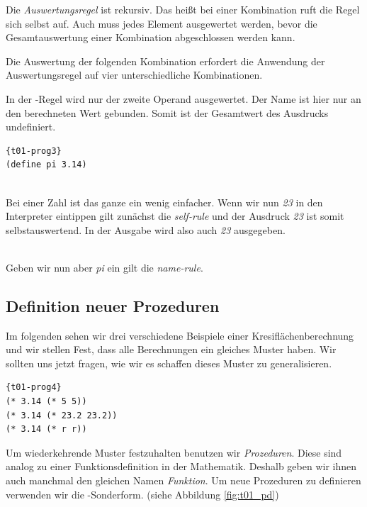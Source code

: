 Die \textit{Auswertungsregel} ist rekursiv. Das heißt bei einer Kombination ruft die Regel sich selbst auf. Auch muss jedes Element ausgewertet werden, bevor die Gesamtauswertung einer Kombination abgeschlossen werden kann.

Die Auswertung der folgenden Kombination erfordert die Anwendung der Auswertungsregel auf vier unterschiedliche Kombinationen.


In der -Regel wird nur der zweite Operand ausgewertet. Der Name ist hier nur an den berechneten Wert gebunden. Somit ist der Gesamtwert des Ausdrucks undefiniert.
\begin{lstlisting}{t01-prog3}
(define pi 3.14)
\end{lstlisting}
 \\

Bei einer Zahl ist das ganze ein wenig einfacher. Wenn wir nun \textit{23} in den Interpreter eintippen gilt zunächst die \textit{self-rule} und der Ausdruck \textit{23} ist somit selbstauswertend. In der Ausgabe wird also auch \textit{23} ausgegeben.

\\

Geben wir nun aber \textit{pi} ein gilt die \textit{name-rule}.


\subsection{Definition neuer Prozeduren}
Im folgenden sehen wir drei verschiedene Beispiele einer Kresiflächenberechnung und wir stellen Fest, dass alle Berechnungen ein gleiches Muster haben. Wir sollten uns jetzt fragen, wie wir es schaffen dieses Muster zu generalisieren.
\begin{lstlisting}{t01-prog4}
(* 3.14 (* 5 5))
(* 3.14 (* 23.2 23.2))
(* 3.14 (* r r))
\end{lstlisting}
Um wiederkehrende Muster festzuhalten benutzen wir \textit{Prozeduren}. Diese sind analog zu einer Funktionsdefinition in der Mathematik. Deshalb geben wir ihnen auch manchmal den gleichen Namen \textit{Funktion}. Um neue Prozeduren zu definieren verwenden wir die -Sonderform. (siehe Abbildung \ref{fig:t01_pd})

